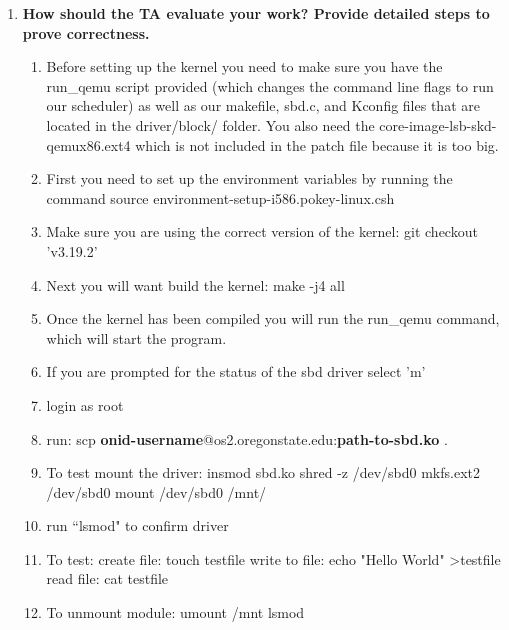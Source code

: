 \documentclass[onecolumn, draftclsnofoot,10pt, compsoc]{IEEEtran}
\begin{document}
\begin{enumerate}
\item \textbf{How should the TA evaluate your work? Provide detailed steps to prove correctness.} 	\begin{enumerate}
	\item Before setting up the kernel you need to make sure you have the run\_qemu script provided (which changes the command line flags to run our scheduler) as well as our makefile, sbd.c, and Kconfig files that are located in the driver/block/ folder. You also need the core-image-lsb-skd-qemux86.ext4 which is not included in the patch file because it is too big.
    
	\item First you need to set up the environment variables by running the command source environment-setup-i586.pokey-linux.csh
    
    \item Make sure you are using the correct version of the kernel: git checkout 'v3.19.2'
    \item Next you will want build the kernel: make -j4 all
    \item Once the kernel has been compiled you will run the run\_qemu command, which will start the program.
    \item If you are prompted for the status of the sbd driver select 'm'
    \item login as root
    \item run: scp \textbf{onid-username}@os2.oregonstate.edu:\textbf{path-to-sbd.ko} .
    
    \item To test mount the driver:
    \subitem insmod sbd.ko
    \subitem shred -z /dev/sbd0
    \subitem mkfs.ext2 /dev/sbd0
    \subitem mount /dev/sbd0 /mnt/
    \item run ``lsmod" to confirm driver
    
    \item To test:
    \subitem create file: touch testfile
    \subitem write to file: echo "Hello World" \textgreater  testfile
    \subitem read file: cat testfile 
    
    \item To unmount module:
    \subitem umount /mnt
    \subitem lsmod 
	\end{enumerate}
\end{enumerate}
\end{document}
